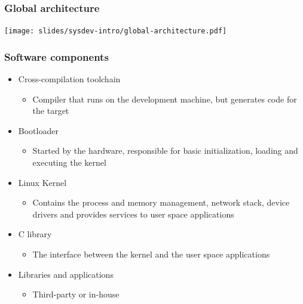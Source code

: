 \begin{frame}
  \frametitle{Global architecture}
  \begin{center}
    \texttt{[image: slides/sysdev-intro/global-architecture.pdf]}
  \end{center}
\end{frame}

\begin{frame}
  \frametitle{Software components}
  \begin{itemize}
  \item Cross-compilation toolchain
    \begin{itemize}
    \item Compiler that runs on the development machine, but generates
      code for the target
    \end{itemize}
  \item Bootloader
    \begin{itemize}
    \item Started by the hardware, responsible for basic
      initialization, loading and executing the kernel
    \end{itemize}
  \item Linux Kernel
    \begin{itemize}
    \item Contains the process and memory management, network stack,
      device drivers and provides services to user space applications
    \end{itemize}
  \item C library
    \begin{itemize}
    \item The interface between the kernel and the user space
      applications
    \end{itemize}
  \item Libraries and applications
    \begin{itemize}
    \item Third-party or in-house
    \end{itemize}
  \end{itemize}
\end{frame}

